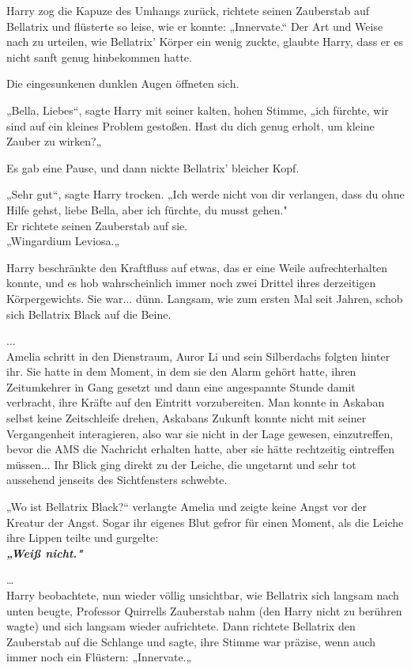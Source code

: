 {Harry zog die Kapuze des Umhangs zurück, richtete seinen Zauberstab auf Bellatrix und flüsterte so leise, wie er konnte: „Innervate.“ Der Art und Weise nach zu urteilen, wie Bellatrix' Körper ein wenig zuckte, glaubte Harry, dass er es nicht sanft genug hinbekommen hatte.

Die eingesunkenen dunklen Augen öffneten sich.

„Bella, Liebes“, sagte Harry mit seiner kalten, hohen Stimme, „ich fürchte, wir sind auf ein kleines Problem gestoßen. Hast du dich genug erholt, um kleine Zauber zu wirken?„

Es gab eine Pause, und dann nickte Bellatrix' bleicher Kopf.

„Sehr gut“, sagte Harry trocken. „Ich werde nicht von dir verlangen, dass du ohne Hilfe gehst, liebe Bella, aber ich fürchte, du musst gehen."\\ Er richtete seinen Zauberstab auf sie.\\ „Wingardium Leviosa.„

Harry beschränkte den Kraftfluss auf etwas, das er eine Weile aufrechterhalten konnte, und es hob wahrscheinlich immer noch zwei Drittel ihres derzeitigen Körpergewichts. Sie war... dünn. Langsam, wie zum ersten Mal seit Jahren, schob sich Bellatrix Black auf die Beine.

...\\ Amelia schritt in den Dienstraum, Auror Li und sein Silberdachs folgten hinter ihr. Sie hatte in dem Moment, in dem sie den Alarm gehört hatte, ihren Zeitumkehrer in Gang gesetzt und dann eine angespannte Stunde damit verbracht, ihre Kräfte auf den Eintritt vorzubereiten. Man konnte in Askaban selbst keine Zeitschleife drehen, Askabans Zukunft konnte nicht mit seiner Vergangenheit interagieren, also war sie nicht in der Lage gewesen, einzutreffen, bevor die AMS die Nachricht erhalten hatte, aber sie hätte rechtzeitig eintreffen müssen... Ihr Blick ging direkt zu der Leiche, die ungetarnt und sehr tot aussehend jenseits des Sichtfensters schwebte.

„Wo ist Bellatrix Black?“ verlangte Amelia und zeigte keine Angst vor der Kreatur der Angst. Sogar ihr eigenes Blut gefror für einen Moment, als die Leiche ihre Lippen teilte und gurgelte:\\

\hfill\break \textbf{\emph{„Weiß nicht."}}

…\\ Harry beobachtete, nun wieder völlig unsichtbar, wie Bellatrix sich langsam nach unten beugte, Professor Quirrells Zauberstab nahm (den Harry nicht zu berühren wagte) und sich langsam wieder aufrichtete. Dann richtete Bellatrix den Zauberstab auf die Schlange und sagte, ihre Stimme war präzise, wenn auch immer noch ein Flüstern: „Innervate.„

}
